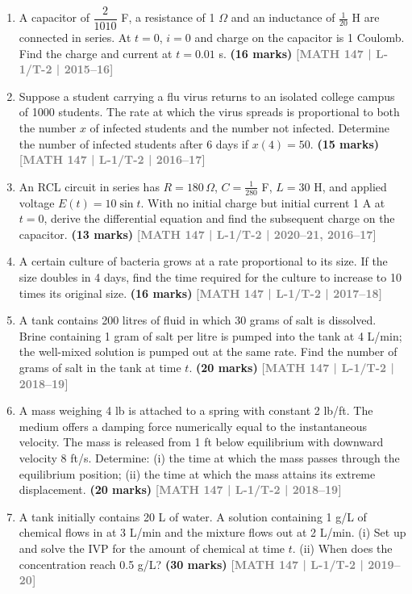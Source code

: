 \documentclass[12pt,a4paper]{article}
\newcommand{\yr}[1]{\hfill\textcolor{gray}{\small\textbf{[#1]}}}
\newcommand{\mk}[1]{\textcolor{orange!70!black}{\small\textbf{(#1 marks)}}}
\begin{document}
\begin{enumerate}

\item A capacitor of $\dfrac{2}{1010}$ F, a resistance of 1 $\Omega$ and an inductance of $\tfrac{1}{20}$ H are connected in series. At $t=0$, $i=0$ and charge on the capacitor is 1 Coulomb. Find the charge and current at $t=0.01$ s.
\mk{16} \yr{MATH 147 | L-1/T-2 | 2015--16}

\item Suppose a student carrying a flu virus returns to an isolated college campus of 1000 students. The rate at which the virus spreads is proportional to both the number $x$ of infected students and the number not infected. Determine the number of infected students after 6 days if $x(4)=50$.
\mk{15} \yr{MATH 147 | L-1/T-2 | 2016--17}

\item An RCL circuit in series has $R=180\,\Omega$, $C=\tfrac{1}{280}$ F, $L=30$ H, and applied voltage $E(t)=10\sin t$. With no initial charge but initial current 1 A at $t=0$, derive the differential equation and find the subsequent charge on the capacitor.
\mk{13} \yr{MATH 147 | L-1/T-2 | 2020--21, 2016--17}

\item A certain culture of bacteria grows at a rate proportional to its size. If the size doubles in 4 days, find the time required for the culture to increase to 10 times its original size.
\mk{16} \yr{MATH 147 | L-1/T-2 | 2017--18}

\item A tank contains 200 litres of fluid in which 30 grams of salt is dissolved. Brine containing 1 gram of salt per litre is pumped into the tank at 4 L/min; the well-mixed solution is pumped out at the same rate. Find the number of grams of salt in the tank at time $t$.
\mk{20} \yr{MATH 147 | L-1/T-2 | 2018--19}

\item A mass weighing 4 lb is attached to a spring with constant 2 lb/ft. The medium offers a damping force numerically equal to the instantaneous velocity. The mass is released from 1 ft below equilibrium with downward velocity 8 ft/s. Determine: (i) the time at which the mass passes through the equilibrium position; (ii) the time at which the mass attains its extreme displacement.
\mk{20} \yr{MATH 147 | L-1/T-2 | 2018--19}

\item A tank initially contains 20 L of water. A solution containing 1 g/L of chemical flows in at 3 L/min and the mixture flows out at 2 L/min. (i) Set up and solve the IVP for the amount of chemical at time $t$. (ii) When does the concentration reach 0.5 g/L?
\mk{30} \yr{MATH 147 | L-1/T-2 | 2019--20}


\end{enumerate}
\end{document}
